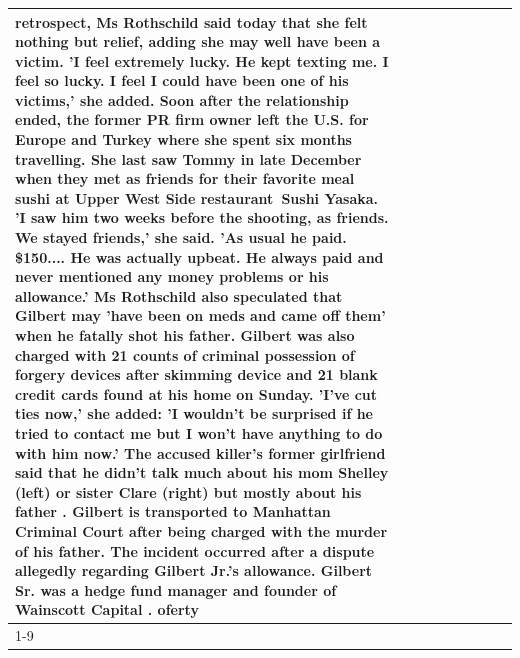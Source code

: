 \begin{table}[H]
\begin{tabular}{lllrlllll}
retrospect, Ms Rothschild said today that she felt nothing but relief, adding she may well have been a victim. 'I feel extremely lucky. He kept texting me. I feel so lucky. I feel I could have been one of his victims,' she added. Soon after the relationship ended, the former PR firm owner left the U.S. for Europe and Turkey where she spent six months  travelling. She last saw Tommy in late December when they met as friends for their favorite meal sushi at Upper West Side restaurant Sushi Yasaka. 'I saw him two weeks before the shooting, as friends. We stayed friends,' she said. 'As usual he paid. \$150.... He was actually upbeat. He always paid and never mentioned any money problems or his allowance.' Ms Rothschild also speculated that Gilbert may 'have been on meds and came off them' when he fatally shot his father. Gilbert was also charged with 21 counts of criminal possession of forgery devices after skimming device and 21 blank credit cards found at his home on Sunday. 'I've cut ties now,' she added: 'I wouldn’t be surprised if he tried to contact me but I won’t have anything to do with him now.' The accused killer's former girlfriend said that he didn't talk much about his mom Shelley (left) or sister Clare (right) but mostly about his father . Gilbert is transported to Manhattan Criminal Court  after being charged with the murder of his father. The incident occurred after a dispute allegedly regarding Gilbert Jr.'s allowance. Gilbert Sr. was a hedge fund manager and founder of Wainscott Capital . oferty \\
\cline{1-9} \cline{2-9}

\end{tabular}
\end{table}
